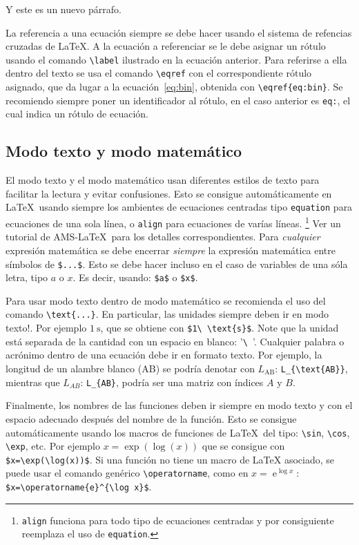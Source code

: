 \documentclass{article}
\begin{document}
Y este es un nuevo párrafo. 

La referencia a una ecuación siempre se debe hacer usando el sistema de refencias cruzadas de \LaTeX{}. A la ecuación a referenciar se le debe asignar un rótulo usando el comando \verb|\label| ilustrado en la ecuación anterior. Para referirse a ella dentro del texto se usa el comando \verb|\eqref| con el correspondiente rótulo asignado, que da lugar a la ecuación~\eqref{eq:bin}, obtenida con \verb|\eqref{eq:bin}|. Se recomiendo siempre poner un identificador al rótulo, en el caso anterior es \verb|eq:|, el cual indica un rótulo de ecuación.

\subsection{Modo texto y modo matemático}

El modo texto y el modo matemático usan diferentes estilos de texto para facilitar la lectura y evitar confusiones. Esto se consigue automáticamente en \LaTeX\ usando siempre los ambientes de ecuaciones centradas tipo \verb|equation| para ecuaciones de una sola línea, o \verb|align| para ecuaciones de varías líneas. 
\footnote{\texttt{align} funciona para todo tipo de ecuaciones centradas y por consiguiente reemplaza el uso de \texttt{equation}. }
Ver un tutorial de AMS-\LaTeX\ para los detalles correspondientes. Para \emph{cualquier} expresión matemática se debe encerrar  \emph{siempre} la expresión matemática entre símbolos de \verb|$...$|.
Esto se debe hacer incluso en el caso de variables de una sóla letra, tipo $a$ o $x$. Es decir, usando: \verb|$a$| o \verb|$x$|.

Para usar modo texto dentro de modo matemático se recomienda el uso del comando \verb|\text{...}|. En particular, las unidades siempre deben ir en modo texto!. Por ejemplo $1\ \text{s}$, que se obtiene con \verb|$1\ \text{s}$|. Note que la unidad está separada de la cantidad con un espacio en blanco: '\verb|\ |'. Cualquier palabra o acrónimo dentro de una ecuación debe ir en formato texto. Por ejemplo, la longitud de un alambre blanco (AB) se podría denotar con $L_{\text{AB}}$: \verb|L_{\text{AB}}|, mientras que $L_{AB}$: \verb|L_{AB}|, podría ser una matriz con índices $A$ y $B$.

Finalmente, los nombres de las funciones deben ir siempre en modo texto y con el espacio adecuado después del nombre de la función. Esto se consigue automáticamente usando los macros de funciones de \LaTeX\ del tipo: \verb|\sin|, \verb|\cos|, \verb|\exp|, etc. Por ejemplo $x=\exp(\log(x))$  que se consigue con \verb|$x=\exp(\log(x))$|. Si una función no tiene un macro de \LaTeX{} asociado, se puede usar el comando genérico \verb|\operatorname|, como en  $x=\operatorname{e}^{\log x}$: \verb|$x=\operatorname{e}^{\log x}$|.
\end{document}
